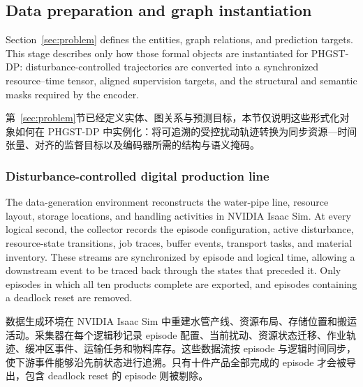 \documentclass[a4paper,fleqn]{cas-dc}
\newcommand{\zhpara}[1]{%
  \par\begingroup\small\color{black!72}\noindent #1\par\endgroup}
\begin{document}
\subsection{Data preparation and graph instantiation}

Section~\ref{sec:problem} defines the entities, graph relations, and prediction targets. This stage describes only how those formal objects are instantiated for PHGST-DP: disturbance-controlled trajectories are converted into a synchronized resource--time tensor, aligned supervision targets, and the structural and semantic masks required by the encoder.

\zhpara{第~\ref{sec:problem}节已经定义实体、图关系与预测目标，本节仅说明这些形式化对象如何在 PHGST-DP 中实例化：将可追溯的受控扰动轨迹转换为同步资源—时间张量、对齐的监督目标以及编码器所需的结构与语义掩码。}

\subsubsection{Disturbance-controlled digital production line}

The data-generation environment reconstructs the water-pipe line, resource layout, storage locations, and handling activities in NVIDIA Isaac Sim. At every logical second, the collector records the episode configuration, active disturbance, resource-state transitions, job traces, buffer events, transport tasks, and material inventory. These streams are synchronized by episode and logical time, allowing a downstream event to be traced back through the states that preceded it. Only episodes in which all ten products complete are exported, and episodes containing a deadlock reset are removed.

\zhpara{数据生成环境在 NVIDIA Isaac Sim 中重建水管产线、资源布局、存储位置和搬运活动。采集器在每个逻辑秒记录 episode 配置、当前扰动、资源状态迁移、作业轨迹、缓冲区事件、运输任务和物料库存。这些数据流按 episode 与逻辑时间同步，使下游事件能够沿先前状态进行追溯。只有十件产品全部完成的 episode 才会被导出，包含 deadlock reset 的 episode 则被剔除。}
\end{document}
